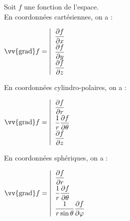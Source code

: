 ﻿\documentclass[a4paper]{article}
\begin{document}
\pagestyle{fancy}
\fancyhf{}
\setlength{\headheight}{15pt}

\begin{center}
	\large{}
\end{center}


Soit \(f\) une fonction de l'espace.\\
En coordonnées cartésiennes, on a :
\begin{center}
\(\vv{\mathrm{grad}}f = \left| \begin{array}{l}
\dfrac{\partial f}{\partial x} \\[5pt]
\dfrac{\partial f}{\partial y} \\[5pt]
\dfrac{\partial f}{\partial z} \end{array} \right.
\)
\end{center}

En coordonnées cylindro-polaires, on a :\begin{center}
\( \vv{\mathrm{grad}}f = \left| \begin{array}{l}
\dfrac{\partial f}{\partial r} \\[5pt]
\dfrac{1}{r}\dfrac{\partial f}{\partial \theta} \\[5pt]
\dfrac{\partial f}{\partial z} \end{array} \right. \)
\end{center}

En coordonnées sphériques, on a :\begin{center}
\( \vv{\mathrm{grad}}f = \left| \begin{array}{l}
\dfrac{\partial f}{\partial r} \\[5pt]
\dfrac{1}{r}\dfrac{\partial f}{\partial \theta} \\[5pt]
\dfrac{1}{r\sin\theta}\dfrac{\partial f}{\partial \varphi} \end{array} \right. \)
\end{center}
\end{document}
